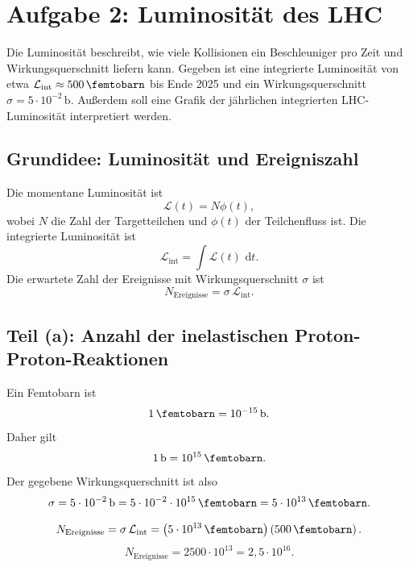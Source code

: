 \documentclass[11pt,a4paper]{scrartcl}
\newcommand{\paren}[1]{\left( #1 \right)}
\newcommand{\dd}{\,\mathrm{d}}
\newcommand{\lum}{\mathcal{L}}
\theoremstyle{definition}
\theoremstyle{plain}
\theoremstyle{remark}
\begin{document}
\FloatBarrier
\newpage

\section{Aufgabe 2: Luminosität des LHC}

\begin{taskbox}
Die Luminosität beschreibt, wie viele Kollisionen ein Beschleuniger pro Zeit und Wirkungsquerschnitt liefern kann. Gegeben ist eine integrierte Luminosität von etwa \(\lum_{\mathrm{int}}\approx\SI{500}{\per\femtobarn}\) bis Ende 2025 und ein Wirkungsquerschnitt \(\sigma=5\cdot10^{-2}\,\si{\barn}\). Außerdem soll eine Grafik der jährlichen integrierten LHC-Luminosität interpretiert werden.
\end{taskbox}

\subsection{Grundidee: Luminosität und Ereigniszahl}

\begin{definitionbox}
Die momentane Luminosität ist
\[
    \lum(t)=N\phi(t),
\]
wobei \(N\) die Zahl der Targetteilchen und \(\phi(t)\) der Teilchenfluss ist. Die integrierte Luminosität ist
\[
    \lum_{\mathrm{int}} = \int \lum(t)\,\dd t.
\]
Die erwartete Zahl der Ereignisse mit Wirkungsquerschnitt \(\sigma\) ist
\[
    N_{\mathrm{Ereignisse}} = \sigma\,\lum_{\mathrm{int}}.
\]
\end{definitionbox}

\subsection{Teil (a): Anzahl der inelastischen Proton-Proton-Reaktionen}

\begin{calculationbox}[title=Einheitenumrechnung]
Ein Femtobarn ist
\[
    \SI{1}{\femtobarn}=10^{-15}\,\si{\barn}.
\]
Daher gilt
\[
    \SI{1}{\barn}=10^{15}\,\si{\femtobarn}.
\]
Der gegebene Wirkungsquerschnitt ist also
\[
    \sigma = 5\cdot10^{-2}\,\si{\barn}
    = 5\cdot10^{-2}\cdot10^{15}\,\si{\femtobarn}
    = 5\cdot10^{13}\,\si{\femtobarn}.
\]
\end{calculationbox}

\begin{calculationbox}[title=Ereigniszahl]
\[
    N_{\mathrm{Ereignisse}}
    = \sigma\,\lum_{\mathrm{int}}
    = \paren{5\cdot10^{13}\,\si{\femtobarn}}
      \paren{500\,\si{\per\femtobarn}}.
\]
\[
    N_{\mathrm{Ereignisse}}
    = 2500\cdot10^{13}
    = 2{,}5\cdot10^{16}.
\]
\end{calculationbox}
\end{document}
